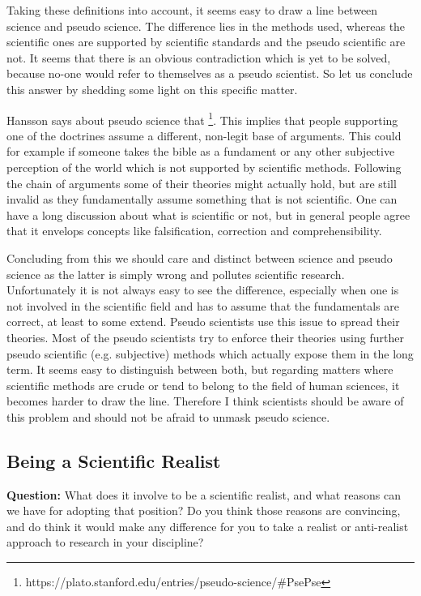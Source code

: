 \documentclass[11pt]{scrartcl}
\begin{document}
Taking these definitions into account, it seems easy to draw a line between science and pseudo science. The difference lies in the methods used, whereas the scientific ones are supported by scientific standards and the pseudo scientific are not. It seems that there is an obvious contradiction which is yet to be solved, because no-one would refer to themselves as a pseudo scientist. So let us conclude this answer by shedding some light on this specific matter.

Hansson says about pseudo science that  \footnote{https://plato.stanford.edu/entries/pseudo-science/\#PsePse}. This implies that people supporting one of the doctrines assume a different, non-legit base of arguments. This could for example if someone takes the bible as a fundament or any other subjective perception of the world which is not supported by scientific methods. Following the chain of arguments some of their theories might actually hold, but are still invalid as they fundamentally assume something that is not scientific. One can have a long discussion about what is scientific or not, but in general people agree that it envelops concepts like falsification, correction and comprehensibility.

Concluding from this we should care and distinct between science and pseudo science as the latter is simply wrong and pollutes scientific research. Unfortunately it is not always easy to see the difference, especially when one is not involved in the scientific field and has to assume that the fundamentals are correct, at least to some extend. Pseudo scientists use this issue to spread their theories. Most of the pseudo scientists try to enforce their theories using further pseudo scientific (e.g. subjective) methods which actually expose them in the long term. It seems easy to distinguish between both, but regarding matters where scientific methods are crude or tend to belong to the field of human sciences, it becomes harder to draw the line. Therefore I think scientists should be aware of this problem and should not be afraid to unmask pseudo science.

\subsection{Being a Scientific Realist}

\textbf{Question:} What does it involve to be a scientific realist, and what reasons can we have for adopting that position? Do you think those reasons are convincing, and do think it would make any difference for you to take a realist or anti-realist approach to research in your discipline?
\end{document}
